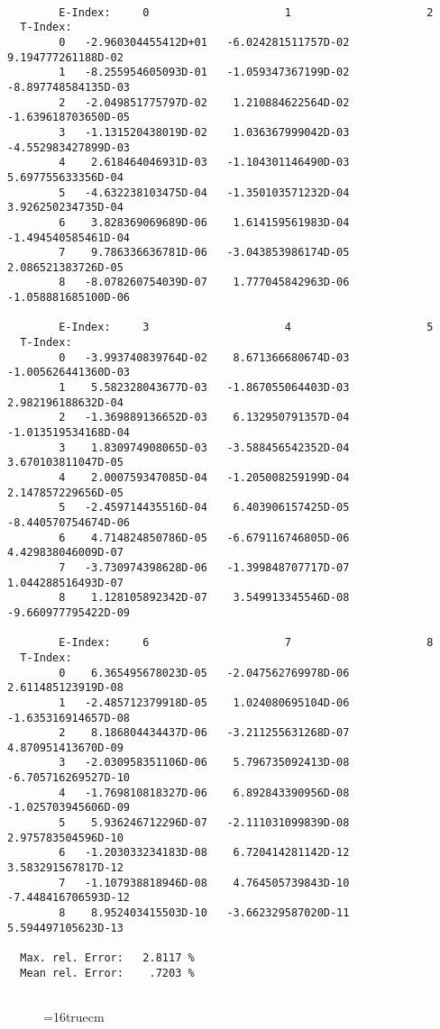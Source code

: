 \documentclass[12pt]{article}
\begin{document}
\begin{small}\begin{verbatim}

        E-Index:     0                     1                     2
  T-Index:
        0   -2.960304455412D+01   -6.024281511757D-02    9.194777261188D-02
        1   -8.255954605093D-01   -1.059347367199D-02   -8.897748584135D-03
        2   -2.049851775797D-02    1.210884622564D-02   -1.639618703650D-05
        3   -1.131520438019D-02    1.036367999042D-03   -4.552983427899D-03
        4    2.618464046931D-03   -1.104301146490D-03    5.697755633356D-04
        5   -4.632238103475D-04   -1.350103571232D-04    3.926250234735D-04
        6    3.828369069689D-06    1.614159561983D-04   -1.494540585461D-04
        7    9.786336636781D-06   -3.043853986174D-05    2.086521383726D-05
        8   -8.078260754039D-07    1.777045842963D-06   -1.058881685100D-06

        E-Index:     3                     4                     5
  T-Index:
        0   -3.993740839764D-02    8.671366680674D-03   -1.005626441360D-03
        1    5.582328043677D-03   -1.867055064403D-03    2.982196188632D-04
        2   -1.369889136652D-03    6.132950791357D-04   -1.013519534168D-04
        3    1.830974908065D-03   -3.588456542352D-04    3.670103811047D-05
        4    2.000759347085D-04   -1.205008259199D-04    2.147857229656D-05
        5   -2.459714435516D-04    6.403906157425D-05   -8.440570754674D-06
        6    4.714824850786D-05   -6.679116746805D-06    4.429838046009D-07
        7   -3.730974398628D-06   -1.399848707717D-07    1.044288516493D-07
        8    1.128105892342D-07    3.549913345546D-08   -9.660977795422D-09

        E-Index:     6                     7                     8
  T-Index:
        0    6.365495678023D-05   -2.047562769978D-06    2.611485123919D-08
        1   -2.485712379918D-05    1.024080695104D-06   -1.635316914657D-08
        2    8.186804434437D-06   -3.211255631268D-07    4.870951413670D-09
        3   -2.030958351106D-06    5.796735092413D-08   -6.705716269527D-10
        4   -1.769810818327D-06    6.892843390956D-08   -1.025703945606D-09
        5    5.936246712296D-07   -2.111031099839D-08    2.975783504596D-10
        6   -1.203033234183D-08    6.720414281142D-12    3.583291567817D-12
        7   -1.107938818946D-08    4.764505739843D-10   -7.448416706593D-12
        8    8.952403415503D-10   -3.662329587020D-11    5.594497105623D-13

  Max. rel. Error:   2.8117 %
  Mean rel. Error:    .7203 %


\end{verbatim}\end{small}
\begin{figure} \label{2.1.8c}
\epsfxsize=16truecm
\end{figure}
\newpage
\end{document}
